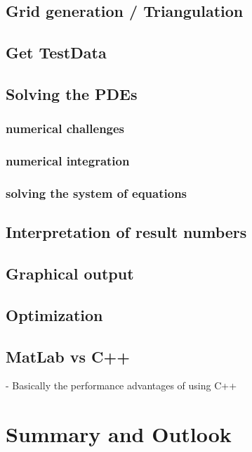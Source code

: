 \documentclass[parskip=half, titlepage=yes, 12pt, BCOR=12mm, DIV=calc]{scrartcl}
\begin{document}
\subsection{Grid generation / Triangulation}

\subsection{Get TestData}

\subsection{Solving the PDEs}
\subsubsection{numerical challenges}
\subsubsection{numerical integration}
\subsubsection{solving the system of equations}

\subsection{Interpretation of result numbers}

\subsection{Graphical output}

\subsection{Optimization}

\subsection{MatLab vs C++}

- Basically the performance advantages of using C++


\section{Summary and Outlook}
\end{document}
